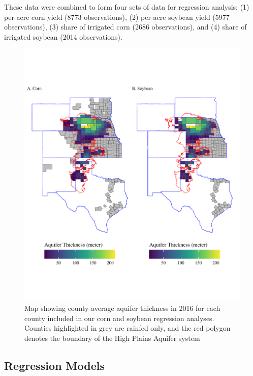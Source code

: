 \documentclass[
]{article}
\begin{document}
These data were combined to form four sets of data for regression analysis: (1) per-acre corn yield (8773 observations), (2) per-acre soybean yield (5977 observations), (3) share of irrigated corn (2686 observations), and (4) share of irrigated soybean (2014 observations).

\begin{figure}[H]

{\centering \includegraphics[width=6in,]{Figures/g_map} 

}

\caption{Map showing county-average aquifer thickness in 2016 for each county included in our corn and soybean regression analyses. Counties highlighted in grey are rainfed only, and the red polygon denotes the boundary of the High Plains Aquifer system}\label{fig:sat-map}
\end{figure}

\hypertarget{regression-models}{%
\subsection{Regression Models}\label{regression-models}}
\end{document}
